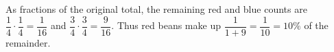 As fractions of the original total, the remaining red and blue counts are $\dfrac{1}{4}\cdot\dfrac{1}{4}=\dfrac{1}{16}$ and $\dfrac{3}{4}\cdot\dfrac{3}{4}=\dfrac{9}{16}$. Thus red beans make up $\dfrac{1}{1+9}=\dfrac{1}{10}=\boxed{10\%}$ of the remainder.
